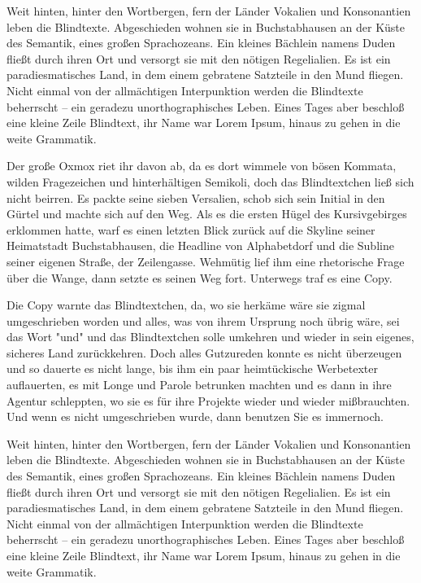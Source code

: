 Weit hinten, hinter den Wortbergen, fern der Länder Vokalien und Konsonantien leben die Blindtexte. Abgeschieden wohnen sie in Buchstabhausen an der Küste des Semantik, eines großen Sprachozeans. Ein kleines Bächlein namens Duden fließt durch ihren Ort und versorgt sie mit den nötigen Regelialien. Es ist ein paradiesmatisches Land, in dem einem gebratene Satzteile in den Mund fliegen. Nicht einmal von der allmächtigen Interpunktion werden die Blindtexte beherrscht – ein geradezu unorthographisches Leben. Eines Tages aber beschloß eine kleine Zeile Blindtext, ihr Name war Lorem Ipsum, hinaus zu gehen in die weite Grammatik.

Der große Oxmox riet ihr davon ab, da es dort wimmele von bösen Kommata, wilden Fragezeichen und hinterhältigen Semikoli, doch das Blindtextchen ließ sich nicht beirren. Es packte seine sieben Versalien, schob sich sein Initial in den Gürtel und machte sich auf den Weg. Als es die ersten Hügel des Kursivgebirges erklommen hatte, warf es einen letzten Blick zurück auf die Skyline seiner Heimatstadt Buchstabhausen, die Headline von Alphabetdorf und die Subline seiner eigenen Straße, der Zeilengasse. Wehmütig lief ihm eine rhetorische Frage über die Wange, dann setzte es seinen Weg fort. Unterwegs traf es eine Copy.

Die Copy warnte das Blindtextchen, da, wo sie herkäme wäre sie zigmal umgeschrieben worden und alles, was von ihrem Ursprung noch übrig wäre, sei das Wort "und" und das Blindtextchen solle umkehren und wieder in sein eigenes, sicheres Land zurückkehren. Doch alles Gutzureden konnte es nicht überzeugen und so dauerte es nicht lange, bis ihm ein paar heimtückische Werbetexter auflauerten, es mit Longe und Parole betrunken machten und es dann in ihre Agentur schleppten, wo sie es für ihre Projekte wieder und wieder mißbrauchten. Und wenn es nicht umgeschrieben wurde, dann benutzen Sie es immernoch.

Weit hinten, hinter den Wortbergen, fern der Länder Vokalien und Konsonantien leben die Blindtexte. Abgeschieden wohnen sie in Buchstabhausen an der Küste des Semantik, eines großen Sprachozeans. Ein kleines Bächlein namens Duden fließt durch ihren Ort und versorgt sie mit den nötigen Regelialien. Es ist ein paradiesmatisches Land, in dem einem gebratene Satzteile in den Mund fliegen. Nicht einmal von der allmächtigen Interpunktion werden die Blindtexte beherrscht – ein geradezu unorthographisches Leben. Eines Tages aber beschloß eine kleine Zeile Blindtext, ihr Name war Lorem Ipsum, hinaus zu gehen in die weite Grammatik.

